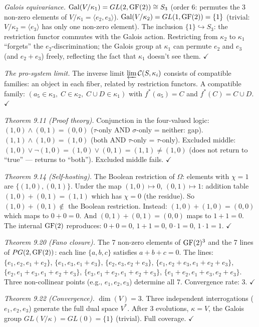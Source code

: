 \emph{Galois equivariance.}
$\mathrm{Gal}(V/\kappa_1) = GL(2, \operatorname{GF}(2)) \cong S_3$
(order 6: permutes the 3 non-zero elements of
$V/\kappa_1 = \langle e_2, e_3 \rangle$).
$\mathrm{Gal}(V/\kappa_2) = GL(1, \operatorname{GF}(2)) = \{1\}$
(trivial: $V/\kappa_2 = \langle e_3 \rangle$ has only
one non-zero element).
The inclusion $\{1\} \hookrightarrow S_3$: the
restriction functor commutes with the Galois action.
Restricting from $\kappa_2$ to $\kappa_1$ ``forgets''
the $e_2$-discrimination; the Galois group at $\kappa_1$
can permute $e_2$ and $e_3$ (and $e_2{+}e_3$) freely,
reflecting the fact that $\kappa_1$ doesn't see them.
$\checkmark$

\emph{The pro-system limit.}
The inverse limit $\varprojlim \mathcal{C}(S, \kappa_i)$
consists of compatible families: an object in each fiber,
related by restriction functors. A compatible family:
$(a_5 \in \kappa_3,\; C \in \kappa_2,\;
C {\cup} D \in \kappa_1)$ with
$f^*(a_5) = C$ and $f^*(C) = C {\cup} D$. $\checkmark$

\emph{Theorem 9.11 (Proof theory).}
Conjunction in the four-valued logic:
$(1,0) \wedge (0,1) = (0,0)$ ($\tau$-only AND
$\sigma$-only = neither: gap).
$(1,1) \wedge (1,0) = (1,0)$ (both AND $\tau$-only
= $\tau$-only).
Excluded middle: $(1,0) \vee \neg(1,0) = (1,0) \vee
(0,1) = (1,1) \neq (1,0)$ (does not return to
``true'' --- returns to ``both''). Excluded middle
fails. $\checkmark$

\emph{Theorem 9.14 (Self-hosting).}
The Boolean restriction of $\Omega$: elements with
$\chi = 1$ are $\{(1,0), (0,1)\}$. Under the map
$(1,0) \mapsto 0$, $(0,1) \mapsto 1$: addition table
$(1,0) + (0,1) = (1,1)$ which has $\chi = 0$
(the residue). So $(1,0) + (0,1) \notin$ the Boolean
restriction. Instead: $(1,0) + (1,0) = (0,0)$ which
maps to $0 + 0 = 0$. And $(0,1) + (0,1) = (0,0)$
maps to $1 + 1 = 0$. The internal $\operatorname{GF}(2)$ reproduces:
$0 + 0 = 0$, $1 + 1 = 0$, $0 \cdot 1 = 0$,
$1 \cdot 1 = 1$. $\checkmark$

\emph{Theorem 9.20 (Fano closure).}
The 7 non-zero elements of $\operatorname{GF}(2)^3$ and the 7 lines
of $PG(2, \operatorname{GF}(2))$: each line $\{a, b, c\}$ satisfies
$a + b + c = 0$. The lines:
$\{e_1, e_2, e_1{+}e_2\}$,
$\{e_1, e_3, e_1{+}e_3\}$,
$\{e_2, e_3, e_2{+}e_3\}$,
$\{e_1, e_2{+}e_3, e_1{+}e_2{+}e_3\}$,
$\{e_2, e_1{+}e_3, e_1{+}e_2{+}e_3\}$,
$\{e_3, e_1{+}e_2, e_1{+}e_2{+}e_3\}$,
$\{e_1{+}e_2, e_1{+}e_3, e_2{+}e_3\}$.
Three non-collinear points (e.g., $e_1, e_2, e_3$)
determine all 7. Convergence rate: 3. $\checkmark$

\emph{Theorem 9.22 (Convergence).}
$\dim(V) = 3$. Three independent interrogations
($e_1, e_2, e_3$) generate the full dual space $V^*$.
After 3 evolutions, $\kappa = V$, the Galois group
$GL(V/\kappa) = GL(0) = \{1\}$ (trivial). Full
coverage. $\checkmark$


